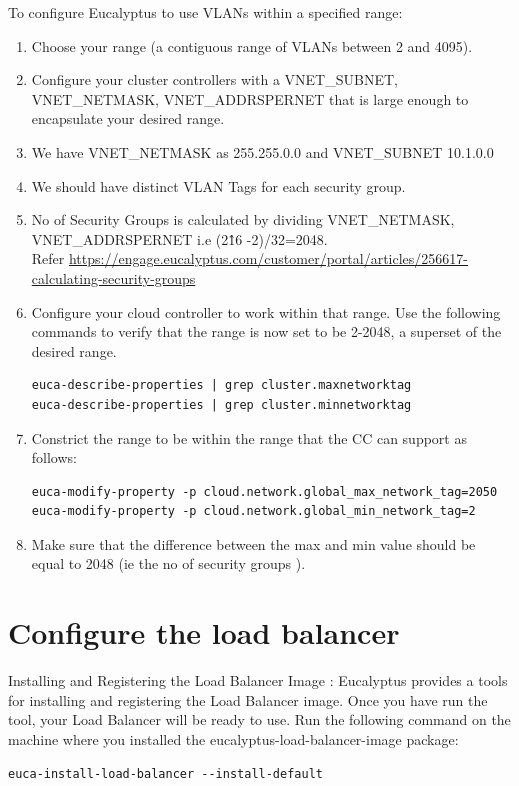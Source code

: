 To configure Eucalyptus to use VLANs within a specified range:
\begin{enumerate}
\item Choose your range (a contiguous range of VLANs between 2 and 4095).
\item Configure your cluster controllers with a VNET\_SUBNET, VNET\_NETMASK, VNET\_ADDRSPERNET that is large enough to encapsulate your desired range.
\item We have VNET\_NETMASK as 255.255.0.0 and VNET\_SUBNET 10.1.0.0
\item We should have distinct VLAN Tags for each security group.
\item No of Security Groups is calculated by dividing VNET\_NETMASK, VNET\_ADDRSPERNET i.e (2\^16 -2)/32=2048. \\ 
Refer \url{https://engage.eucalyptus.com/customer/portal/articles/256617-calculating-security-groups}
\item Configure your cloud controller to work within that range. Use the following commands to verify that the range is now set to be 2-2048, a superset of the desired range.
\begin{lstlisting}
euca-describe-properties | grep cluster.maxnetworktag  
euca-describe-properties | grep cluster.minnetworktag
\end{lstlisting}
\item Constrict the range to be within the range that the CC can support as follows:
\begin{lstlisting}
euca-modify-property -p cloud.network.global_max_network_tag=2050
euca-modify-property -p cloud.network.global_min_network_tag=2
\end{lstlisting}
\item Make sure that the difference between the max and min value should be equal to 2048 (ie the no of security groups ).
\end{enumerate}
\section{Configure the load balancer}
Installing and Registering the Load Balancer Image :
Eucalyptus provides a tools for installing and registering the Load Balancer image. Once you have run the tool, your Load Balancer will be ready to use.
Run the following command on the machine where you installed the eucalyptus-load-balancer-image package:

\begin{lstlisting}
euca-install-load-balancer --install-default
\end{lstlisting}

